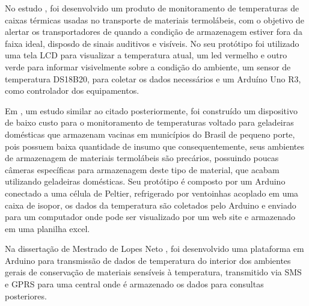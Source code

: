 No estudo \cite{lima2019controle}, foi desenvolvido um produto de monitoramento de temperaturas de caixas térmicas usadas no transporte de materiais termolábeis, com o  objetivo de alertar os transportadores de quando a condição de armazenagem estiver fora da faixa ideal, disposdo de sinais auditivos e visíveis. No seu protótipo foi utilizado uma tela LCD para visualizar a temperatura atual, um led vermelho e outro verde para informar visivelmente sobre a condição do ambiente, um sensor de temperatura DS18B20, para coletar os dados necessários e um Arduíno Uno R3, como controlador dos equipamentos.

Em \cite{kersbaum2019monitoramento}, um estudo similar ao citado posteriormente, foi construído um dispositivo de baixo custo para o monitoramento de temperaturas voltado para geladeiras domésticas que armazenam vacinas em municípios do Brasil de pequeno porte, pois possuem baixa quantidade de insumo que consequentemente, seus ambientes de armazenagem de materiais termolábeis são precários, possuindo poucas câmeras específicas para armazenagem deste tipo de material, que acabam utilizando geladeiras domésticas. Seu protótipo é composto por um Arduino conectado a uma célula de Peltier, refrigerado por ventoinhas acoplado em uma caixa de isopor, os dados da temperatura são coletados pelo Arduino e enviado para um computador onde pode ser visualizado por um web site e armazenado em uma planilha excel.

Na dissertação de Mestrado de Lopes Neto \cite{lopes2019monitoramento}, foi desenvolvido uma plataforma em Arduino para transmissão de dados de temperatura do interior dos ambientes gerais de conservação de materiais sensíveis à temperatura, transmitido via SMS e GPRS para uma central onde é armazenado os dados para consultas posteriores.







